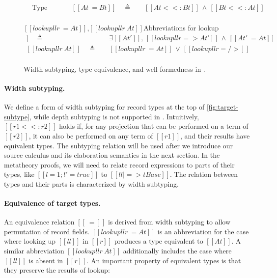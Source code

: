 \begin{figure}
  \small

  \begin{align*}
    &\text{Type equivalence} &[[At ~= Bt]] \quad\triangleq\quad& [[At <<: Bt]] \,\land\, [[Bt <<: At]] \\
  \end{align*}

  \ottdefnsRTSubtyping

  \begin{rulesection*}{$[[ lookup ll r ~= At ]]$,$[[ lookup ll r ~ At ]]$}{Abbreviations for lookup}
  \begin{align*}
    [[ lookup ll r ~= At]] \quad\triangleq\quad& \exists [[At']],\, [[lookup ll r => At']] \,\land\, [[At' ~= At]] \\
    [[ lookup ll r ~ At]]  \quad\triangleq\quad& [[lookup ll r ~= At]] \,\lor\, [[lookup ll r =/>]] \\
  \end{align*}
  \end{rulesection*}
  \ottdefnsWellformedCtx
  \ottdefnsWellformedTypes

  \caption{Width subtyping, type equivalence, and well-formedness in \lambdar.}
  \label{fig:target-subtype}
\end{figure}

\paragraph{Width subtyping.}
We define a form of width subtyping for record types at the top of
\autoref{fig:target-subtype}, while depth subtyping is not supported in
\lambdar. Intuitively, $[[ r1 <<: r2 ]]$ holds if, for any projection that can
be performed on a term of $[[r2]]$, it can also be performed on any term of
$[[r1]]$, and their results have equivalent types. The subtyping relation will
be used after we introduce our source calculus and its elaboration semantics in
the next section. In the metatheory proofs, we will need to relate record
expressions to parts of their types, like $[[{l=1 ; l'=true}]]$ to
$[[{ll|=>tBase}]]$. The relation between types and their parts is characterized
by width subtyping.

\paragraph{Equivalence of target types.}
An equivalence relation $[[~=]]$ is derived from width subtyping to allow
permutation of record fields. $[[ lookup ll r ~= At]]$ is an abbreviation for
the case where looking up $[[ll]]$ in $[[r]]$ produces a type equivalent to
$[[At]]$. A similar abbreviation $[[ lookup ll r ~ At]]$ additionally includes
the case where $[[ll]]$ is absent in $[[r]]$. An important property of
equivalent types is that they preserve the results of lookup:

